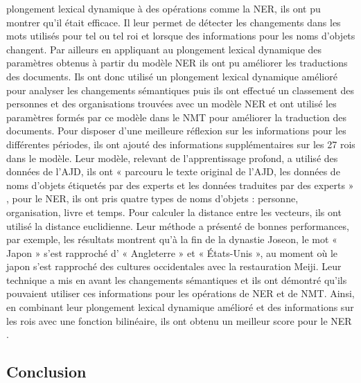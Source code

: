 \documentclass{article}
\begin{document}
plongement lexical dynamique à des opérations comme la NER, ils ont pu montrer qu’il était efficace. Il leur permet de détecter les changements dans les mots utilisés pour tel ou tel roi et lorsque des informations pour les noms d’objets changent. Par ailleurs en appliquant au plongement lexical dynamique des paramètres obtenus à partir du modèle NER ils ont pu améliorer les traductions des documents. Ils ont donc utilisé un plongement lexical dynamique amélioré pour analyser les changements sémantiques puis ils ont effectué un classement des personnes et des organisations trouvées avec un modèle NER et ont utilisé les paramètres formés par ce modèle dans le NMT pour améliorer la traduction des documents. Pour disposer d’une meilleure réflexion sur les informations pour les différentes périodes, ils ont ajouté des informations supplémentaires sur les 27 rois dans le modèle. Leur modèle, relevant de l’apprentissage profond, a utilisé des données de l’AJD, ils ont « parcouru le texte original de l’AJD, les données de noms d’objets étiquetés par des experts et les données traduites par des experts » \cite{jin2020korean}, pour le NER, ils ont pris quatre types de noms d’objets : personne, organisation, livre et temps. Pour calculer la distance entre les vecteurs, ils ont utilisé la distance euclidienne. Leur méthode a présenté de bonnes performances, par exemple, les résultats montrent qu’à la fin de la dynastie Joseon, le mot « Japon » s’est rapproché d’ « Angleterre » et « États-Unis », au moment où le japon s’est rapproché des cultures occidentales avec la restauration Meiji. Leur technique a mis en avant les changements sémantiques et ils ont démontré qu’ils pouvaient utiliser ces informations pour les opérations de NER et de NMT. Ainsi, en combinant leur plongement lexical dynamique amélioré et des informations sur les rois avec une fonction bilinéaire, ils ont obtenu un meilleur score pour le NER \cite{jin2020korean}.
\subsection{Conclusion}
\end{document}
